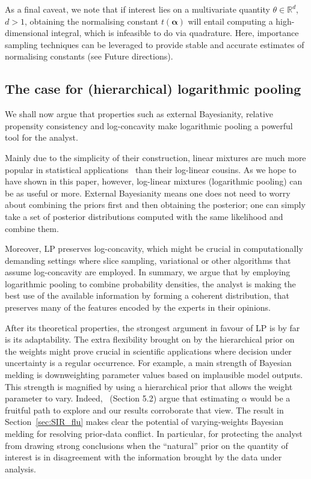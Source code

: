 \documentclass[12pt]{article}
\begin{document}
As a final caveat, we note that if interest lies on a multivariate quantity $\theta \in \mathbb{R}^d$, $d>1$, obtaining the normalising constant $t(\boldsymbol\alpha)$ will entail computing a high-dimensional integral, which is infeasible to do via quadrature.
Here, importance sampling techniques can be leveraged to provide stable and accurate estimates of normalising constants (see Future directions). 


\subsection{The case for (hierarchical) logarithmic pooling}

We shall now argue that properties such as external Bayesianity, relative propensity consistency and log-concavity make logarithmic pooling a powerful tool for the analyst.

Mainly due to the simplicity of their construction, linear mixtures are much more popular in statistical applications~\parencite{Fruhwirth2019} than their log-linear cousins.
As we hope to have shown in this paper, however, log-linear mixtures (logarithmic pooling) can be as useful or more.
External Bayesianity means one does not need to worry about combining the priors first and then obtaining the posterior; one can simply take a set of posterior distributions computed with the same likelihood and combine them.

Moreover, LP preserves log-concavity, which might be crucial in computationally demanding settings where slice sampling, variational or other algorithms that assume log-concavity are employed.
In summary, we argue that by employing logarithmic pooling to combine probability densities, the analyst is making the best use of the available information by forming a coherent distribution, that preserves many of the features encoded by the experts in their opinions.

After its theoretical properties, the strongest argument in favour of LP is by far is its adaptability.
The extra flexibility brought on by the hierarchical prior on the weights might prove crucial in scientific applications where decision under uncertainty is a regular occurrence.
For example, a main strength of Bayesian melding is downweighting parameter values based on implausible model outputs.
This strength is magnified by using a hierarchical prior that allows the weight parameter to vary.
Indeed,~\textcite{Poole2000} (Section 5.2) argue that estimating $\alpha$ would be a fruitful path to explore and our results corroborate that view.
The result in Section~\ref{sec:SIR_flu} makes clear the potential of varying-weights Bayesian melding for resolving prior-data conflict.
In particular, for protecting the analyst from drawing strong conclusions when the ``natural'' prior on the quantity of interest is in disagreement with the information brought by the data under analysis.
\end{document}
